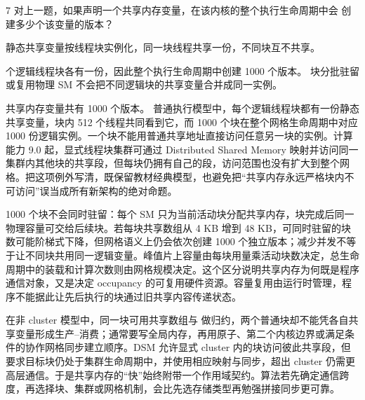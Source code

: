 \begin{solutionexercise}{7}
\problemheading 对上一题，如果声明一个共享内存变量，在该内核的整个执行生命周期中会
创建多少个该变量的版本？

\approachheading 静态共享变量按线程块实例化，同一块线程共享一份，不同块互不共享。

 个逻辑线程块各有一份，因此整个执行生命周期中创建 1000 个版本。
块分批驻留或复用物理 SM 不会把不同逻辑块的共享变量合并成同一实例。

\conclusionheading 共享内存变量共有 1000 个版本。
\discussionheading
{}
普通执行模型中，每个逻辑线程块都有一份静态共享变量，块内 512 个线程共同看到它，而 1000 个块在整个网格生命周期中对应 1000 份逻辑实例。一个块不能用普通共享地址直接访问任意另一块的实例。计算能力 9.0 起，显式线程块集群可通过 Distributed Shared Memory 映射并访问同一集群内其他块的共享段，但每块仍拥有自己的段，访问范围也没有扩大到整个网格。把这项例外写清，既保留教材经典模型，也避免把“共享内存永远严格块内不可访问”误当成所有新架构的绝对命题。

1000 个块不会同时驻留：每个 SM 只为当前活动块分配共享内存，块完成后同一物理容量可交给后续块。若每块共享数组从 4 KB 增到 48 KB，可同时驻留的块数可能阶梯式下降，但网格语义上仍会依次创建 1000 个独立版本；减少并发不等于让不同块共用同一逻辑变量。峰值片上容量由每块用量乘活动块数决定，总生命周期中的装载和计算次数则由网格规模决定。这个区分说明共享内存为何既是程序通信对象，又是决定 occupancy 的可复用硬件资源。容量复用由运行时管理，程序不能据此让先后执行的块通过旧共享内容传递状态。

在非 cluster 模型中，同一块可用共享数组与  做归约，两个普通块却不能凭各自共享变量形成生产--消费；通常要写全局内存，再用原子、第二个内核边界或满足条件的协作网格同步建立顺序。DSM 允许显式 cluster 内的块访问彼此共享段，但要求目标块仍处于集群生命周期中，并使用相应映射与同步，超出 cluster 仍需更高层通信。于是共享内存的“快”始终附带一个作用域契约。算法若先确定通信跨度，再选择块、集群或网格机制，会比先选存储类型再勉强拼接同步更可靠。


\end{solutionexercise}
